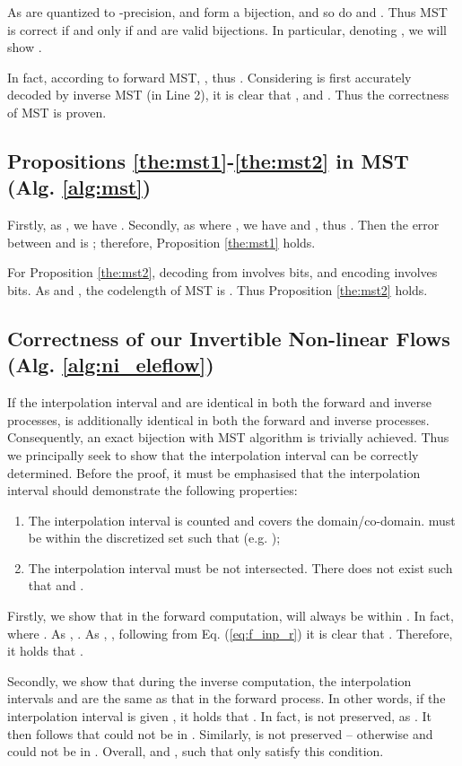 \documentclass{article}
\begin{document}
As  are quantized to -precision,  and  form a bijection, and so do  and . 
Thus MST is correct if and only if  and  are valid bijections. In particular, denoting , we will show .

In fact, according to forward MST, , thus . Considering  is first accurately decoded by inverse MST (in Line 2), it is clear that , and . Thus the correctness of MST is proven.

\subsection{Propositions \ref{the:mst1}-\ref{the:mst2} in MST (Alg. \ref{alg:mst})}

Firstly, as , we have . Secondly, as  where , we have  and , thus . Then the error between  and  is ; therefore, Proposition \ref{the:mst1} holds.

For Proposition \ref{the:mst2}, decoding from  involves  bits, and encoding  involves  bits. As  and , the codelength of MST is . Thus Proposition \ref{the:mst2} holds.

\subsection{Correctness of our Invertible Non-linear Flows (Alg. \ref{alg:ni_eleflow})}

If the interpolation interval  and  are identical in both the forward and inverse processes,  is additionally identical in both the forward and inverse processes. Consequently, an exact bijection with MST algorithm is trivially achieved. Thus we principally seek to show that the interpolation interval can be correctly determined. Before the proof, it must be emphasised that the interpolation interval should demonstrate the following properties:
\begin{enumerate}
    \item The interpolation interval is counted and covers the domain/co-domain.  must be within the discretized set such that  (e.g. );
    \item The interpolation interval must be not intersected. There does not exist  such that  and . 
\end{enumerate}

Firstly, we show that in the forward computation,  will always be within . In fact,  where . As , . As , , following from Eq. (\ref{eq:f_inp_r}) it is clear that . Therefore, it holds that .

Secondly, we show that during the inverse computation, the interpolation intervals  and  are the same as that in the forward process. In other words, if the interpolation interval is  given , it holds that . In fact,  is not preserved, as . It then follows that  could not be in . Similarly,  is not preserved -- otherwise  and  could not be in . Overall,  and , such that only  satisfy this condition.
\end{document}
